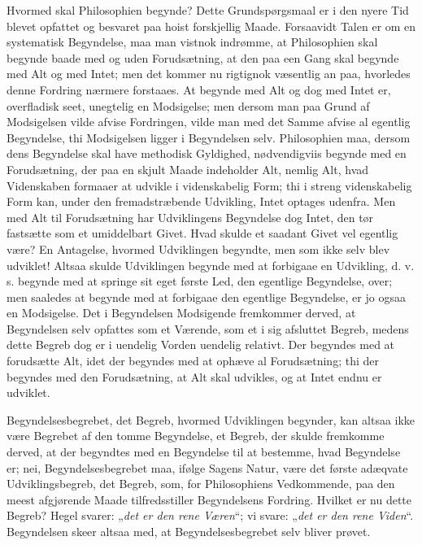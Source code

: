\documentclass[11pt]{book}
\newcommand{\opage}[1]{\marginnote{\footnotesize\textit{[#1]}}}
\begin{document}
\opage{1} \setcounter{footnote}{0}%
Hvormed skal Philosophien begynde? Dette Grundspørgsmaal er i den
nyere Tid blevet opfattet og besvaret paa hoist forskjellig Maade.
Forsaavidt Talen er om en systematisk Begyndelse, maa man vistnok
indrømme, at Philosophien skal begynde baade med og uden
Forudsætning, at den paa een Gang skal begynde med Alt og med Intet;
men det kommer nu rigtignok væsentlig an paa, hvorledes denne Fordring
nærmere forstaaes. At begynde med Alt og dog med Intet er, overfladisk
seet, unegtelig en Modsigelse; men dersom man paa Grund af Modsigelsen
vilde afvise Fordringen, vilde man med det Samme afvise al egentlig
Begyndelse, thi Modsigelsen ligger i Begyndelsen selv. Philosophien
maa, dersom dens Begyndelse skal have methodisk Gyldighed,
nødvendigviis begynde med en Forudsætning, der paa en skjult Maade
indeholder Alt, nemlig Alt, hvad Videnskaben formaaer at udvikle i
videnskabelig Form; thi i streng
\opage{2} \setcounter{footnote}{0}%
videnskabelig Form kan, under den fremadstræbende Udvikling, Intet
optages udenfra. Men med Alt til Forudsætning har Udviklingens
Begyndelse dog Intet, den tør fastsætte som et umiddelbart Givet. Hvad
skulde et saadant Givet vel egentlig være? En Antagelse, hvormed
Udviklingen begyndte, men som ikke selv blev udviklet! Altsaa skulde
Udviklingen begynde med at forbigaae en Udvikling, d. v. s. begynde med
at springe sit eget første Led, den egentlige Begyndelse, over; men
saaledes at begynde med at forbigaae den egentlige Begyndelse, er jo
ogsaa en Modsigelse. Det i Begyndelsen Modsigende fremkommer derved, at
Begyndelsen selv opfattes som et Værende, som et i sig afsluttet
Begreb, medens dette Begreb dog er i uendelig Vorden uendelig relativt.
Der begyndes med at forudsætte Alt, idet der begyndes med at ophæve al
Forudsætning; thi der begyndes med den Forudsætning, at Alt skal
udvikles, og at Intet endnu er udviklet.

Begyndelsesbegrebet, det Begreb, hvormed Udviklingen begynder, kan
altsaa ikke være Begrebet af den tomme Begyndelse, et Begreb, der
skulde fremkomme derved, at der begyndtes med en Begyndelse til at
bestemme, hvad Begyndelse er; nei, Begyndelsesbegrebet maa, ifølge
Sagens Natur, være det første adæqvate Udviklingsbegreb, det Begreb,
som, for Philosophiens Vedkommende, paa den meest afgjørende Maade
tilfredsstiller Begyndelsens Fordring. Hvilket er nu dette Begreb?
Hegel svarer: „\emph{det er den rene Væren}“; vi svare: „\emph{det er
den rene Viden}“. Begyndelsen skeer altsaa med, at
Begyndelsesbegrebet selv bliver prøvet.
\end{document}
